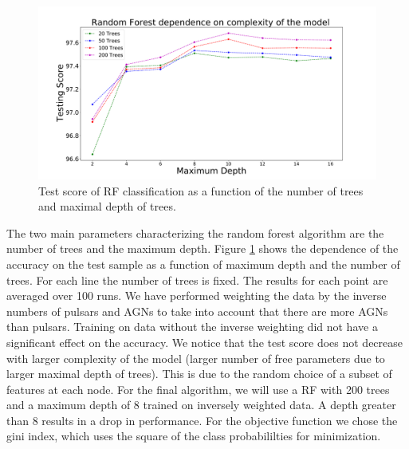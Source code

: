 \begin{figure}[h]
\includegraphics[width=\twopicsp\textwidth]{plots/assocvstrees}
\caption{
Test score of RF classification as a function of the number of trees and maximal depth of trees.
}
\label{fig:RF_complexity}
\end{figure}

The two main parameters characterizing the random forest algorithm are the number of trees and the maximum depth. 
Figure \ref{fig:RF_complexity} shows the dependence of the accuracy on the test sample as a function of maximum depth and the number of trees. For each line the number of trees is fixed.
The results for each point are averaged over 100 runs.
We have performed weighting the data by the inverse numbers of pulsars and AGNs to take into account that there are more AGNs than pulsars. Training on data without the inverse weighting did not have a significant effect on the accuracy.
We notice that the test score does not decrease with larger complexity of the model 
(larger number of free parameters due to larger maximal depth of trees).
This is due to the random choice of a subset of features at each node.
For the final algorithm, we will use a RF with 200 trees and a maximum depth of 8 trained on inversely weighted data. A depth greater than 8 results in a drop in performance. For the objective function we chose the gini index, which uses the square of the class probabililties for minimization.\\

